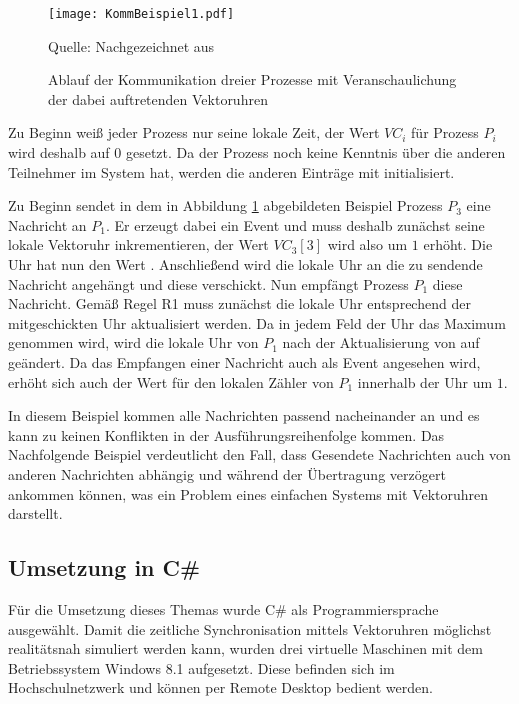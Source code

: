 \begin{figure}[ht]
	\centering
	\texttt{[image: KommBeispiel1.pdf]}
	\caption[Beispiel einer Kommunikation]{Ablauf der Kommunikation dreier Prozesse mit Veranschaulichung der dabei auftretenden Vektoruhren}
	Quelle: Nachgezeichnet aus \cite{Baldoni:2002:FDC:1435723.1437765}
\label{figure:kommBeispiel1}
\end{figure}
\FloatBarrier

Zu Beginn weiß jeder Prozess nur seine lokale Zeit, der Wert $VC_i$ für Prozess $P_i$ wird deshalb auf $0$ gesetzt. Da der Prozess noch keine Kenntnis über die anderen Teilnehmer im System hat, werden die anderen Einträge mit \qq{$-$} initialisiert.

Zu Beginn sendet in dem in Abbildung \ref{figure:kommBeispiel1} abgebildeten Beispiel Prozess $P_3$ eine Nachricht an $P_1$. Er erzeugt dabei ein Event und muss deshalb zunächst seine lokale Vektoruhr inkrementieren, der Wert $VC_3[3]$ wird also um $1$ erhöht. Die Uhr hat nun den Wert . Anschließend wird die lokale Uhr an die zu sendende Nachricht angehängt und diese verschickt.
Nun empfängt Prozess $P_1$ diese Nachricht. Gemäß Regel R1 muss zunächst die lokale Uhr entsprechend der mitgeschickten Uhr aktualisiert werden. Da in jedem Feld der Uhr das Maximum genommen wird, wird die lokale Uhr von $P_1$ nach der Aktualisierung von  auf  geändert. Da das Empfangen einer Nachricht auch als Event angesehen wird, erhöht sich auch der Wert für den lokalen Zähler von $P_1$ innerhalb der Uhr um $1$.

In diesem Beispiel kommen alle Nachrichten passend nacheinander an und es kann zu keinen Konflikten in der Ausführungsreihenfolge kommen. Das Nachfolgende Beispiel verdeutlicht den Fall, dass Gesendete Nachrichten auch von anderen Nachrichten abhängig und während der Übertragung verzögert ankommen können, was ein Problem eines einfachen Systems mit Vektoruhren darstellt.




\subsection{Umsetzung in C\#}
Für die Umsetzung dieses Themas wurde C\# als Programmiersprache ausgewählt. Damit die zeitliche Synchronisation mittels Vektoruhren möglichst realitätsnah simuliert werden kann, wurden drei virtuelle Maschinen mit dem Betriebssystem Windows 8.1 aufgesetzt. Diese befinden sich im Hochschulnetzwerk und können per Remote Desktop bedient werden.

